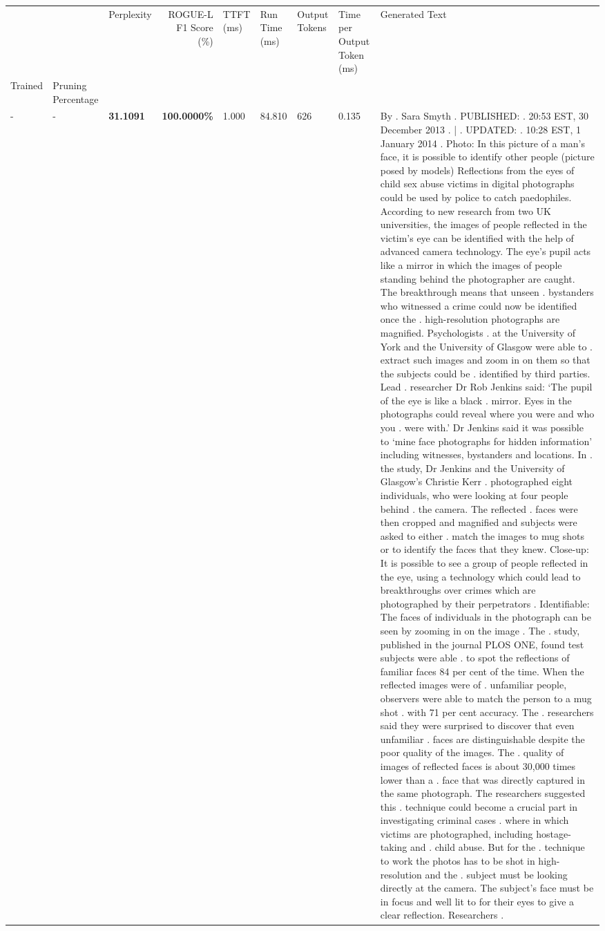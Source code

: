 \begin{table}[H]
\label{tab:evaluation-pipeline-5}
\begin{tabular}{lllrlllll}
\toprule
 &  & Perplexity & ROGUE-L F1 Score (\%) & TTFT (ms) & Run Time (ms) & Output Tokens & Time per Output Token (ms) & Generated Text \\
Trained & Pruning Percentage &  &  &  &  &  &  &  \\
\midrule
- & - & \bfseries 31.1091 & \bfseries 100.0000\% & 1.000 & 84.810 & 626 & 0.135 & By . Sara Smyth . PUBLISHED: . 20:53 EST, 30 December 2013 . | . UPDATED: . 10:28 EST, 1 January 2014 . Photo: In this picture of a man's face, it is possible to identify other people (picture posed by models) Reflections from the eyes of child sex abuse victims in digital photographs could be used by police to catch paedophiles. According to new research from two UK universities, the images of people reflected in the victim's eye can be identified with the help of advanced camera technology. The eye's pupil acts like a mirror in which the images of people standing behind the photographer are caught. The breakthrough means that unseen . bystanders who witnessed a crime could now be identified once the . high-resolution photographs are magnified. Psychologists . at the University of York and the University of Glasgow were able to . extract such images and zoom in on them so that the subjects could be . identified by third parties. Lead . researcher Dr Rob Jenkins said: ‘The pupil of the eye is like a black . mirror. Eyes in the photographs could reveal where you were and who you . were with.' Dr Jenkins said it was possible to ‘mine face photographs for hidden information' including witnesses, bystanders and locations. In . the study, Dr Jenkins and the University of Glasgow's Christie Kerr . photographed eight individuals, who were looking at four people behind . the camera. The reflected . faces were then cropped and magnified and subjects were asked to either . match the images to mug shots or to identify the faces that they knew. Close-up: It is possible to see a group of people reflected in the eye, using a technology which could lead to breakthroughs over crimes which are photographed by their perpetrators . Identifiable: The faces of individuals in the photograph can be seen by zooming in on the image . The . study, published in the journal PLOS ONE, found test subjects were able . to spot the reflections of familiar faces 84 per cent of the time. When the reflected images were of . unfamiliar people, observers were able to match the person to a mug shot . with 71 per cent accuracy. The . researchers said they were surprised to discover that even unfamiliar . faces are distinguishable despite the poor quality of the images. The . quality of images of reflected faces is about 30,000 times lower than a . face that was directly captured in the same photograph. The researchers suggested this . technique could become a crucial part in investigating criminal cases . where in which victims are photographed, including hostage-taking and . child abuse. But for the . technique to work the photos has to be shot in high-resolution and the . subject must be looking directly at the camera. The subject's face must be in focus and well lit to for their eyes to give a clear reflection. Researchers . 
\end{tabular}
\end{table}

